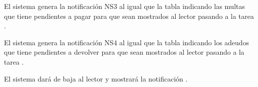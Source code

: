 \begin{PDescripcion}
\begin{enumerate}
      \Ppaso[\itarea]  El sistema genera la notificación NS3 al igual que la tabla indicando las multas que tiene pendientes a pagar para que sean mostrados al lector pasando a la tarea . 

      \Ppaso[\itarea]  El sistema genera la notificación NS4 al igual que la tabla indicando los adeudos que tiene pendientes a devolver para que sean mostrados al lector pasando a la tarea .

      \Ppaso[\itarea]  El sistema dará de baja al lector y mostrará la notificación .

    \end{enumerate}

\end{PDescripcion}
